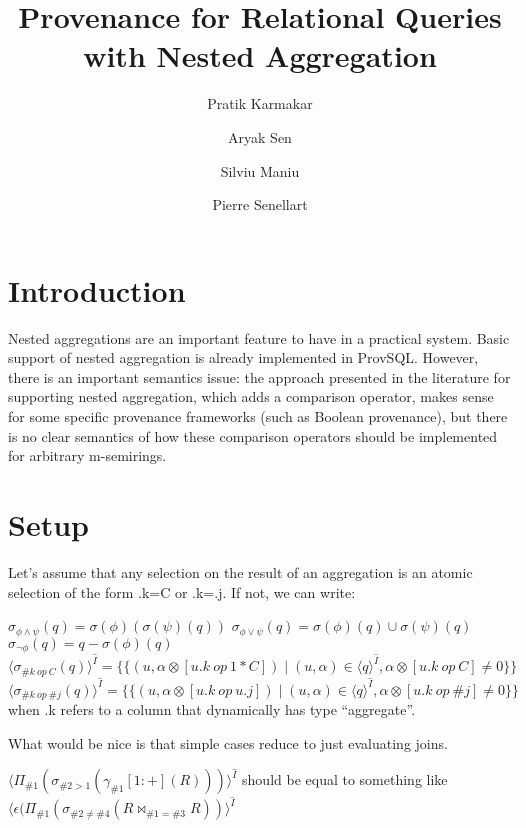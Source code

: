 \documentclass[10pt,a4paper]{scrartcl}
\title{Provenance for Relational Queries with Nested Aggregation}
\author{Pratik Karmakar \and Aryak Sen \and Silviu Maniu \and Pierre Senellart}
\date{}
\theoremstyle{definition}
\theoremstyle{remark}
\begin{document}
\maketitle
\section{Introduction}
Nested aggregations are an important feature to
have in a practical system. Basic support of nested aggregation
is already implemented in ProvSQL. However, there is an
important semantics issue: the approach presented in the
literature for supporting nested aggregation, which adds a
comparison operator, makes sense for some specific provenance
frameworks (such as Boolean provenance), but there is no
clear semantics of how these comparison operators should
be implemented for arbitrary m-semirings.
\section{Setup}
Let's assume that any selection on the result of an aggregation is an 
atomic selection of the form .k=C or .k=.j. If not, we can write:

$\sigma_{\phi\land\psi}(q)=\sigma(\phi)(\sigma(\psi)(q))$
$\sigma_{\phi\lor\psi}(q)=\sigma(\phi)(q)\cup\sigma(\psi)(q)$
$\sigma_{\lnot\phi}(q)=q-\sigma(\phi)(q)$\\

$
\langle\sigma_{\#k\ op\ C}(q)\rangle^{\hat I}
=\{\{(u,\alpha\otimes[u.k\ op\ 1*C])\mid(u,\alpha)\in \langle q\rangle^{\hat I}, \alpha\otimes[u.k\ op\ C]\neq 0\}\}
$\\

$
\langle\sigma_{\#k\ op\ \#j}(q)\rangle^{\hat I}
=\{\{(u,\alpha\otimes[u.k\ op\ u.j])\mid(u,\alpha)\in \langle q\rangle^{\hat I}, \alpha\otimes[u.k\ op\ \#j]\neq 0\}\}
$\\
when .k refers to a column that dynamically has type “aggregate”.


What would be nice is that simple cases reduce to just evaluating joins.

$\langle\Pi_{\#1}(\sigma_{\#2>1}(\gamma_{\#1}[1:+](R)))\rangle^{\hat I}$
should be equal to something like
$\langle \epsilon(\Pi_{\#1}(\sigma_{\#2\neq\#4}(R\bowtie_{\#1=\#3} R))\rangle^{\hat I}$
\end{document}

